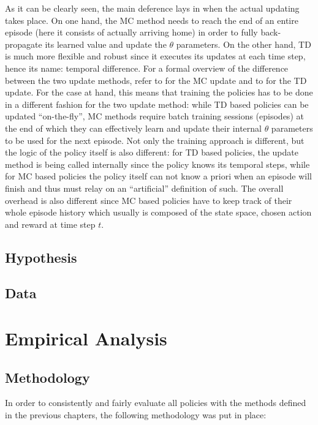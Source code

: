 \documentclass{seal_thesis}
\begin{document}
As it can be clearly seen, the main deference lays in when the actual updating takes place. On one hand, the MC method needs to reach the end of an entire episode (\ie here it consists of actually arriving home) in order to fully back-propagate its learned value and update the $\theta$ parameters. On the other hand, TD is much more flexible and robust since it executes its updates at each time step, hence its name: temporal difference.
For a formal overview of the difference between the two update methods, refer to  for the MC update and to  for the TD update.
For the case at hand, this means that training the policies has to be done in a different fashion for the two update method: while TD based policies can be updated ``on-the-fly'', MC methods require batch training sessions (\ie episodes) at the end of which they can effectively learn and update their internal $\theta$ parameters to be used for the next episode. Not only the training approach is different, but the logic of the policy itself is also different: for TD based policies, the update method is being called internally since the policy knows its temporal steps, while for MC based policies the policy itself can not know a priori when an episode will finish and thus must relay on an ``artificial'' definition of such. The overall overhead is also different since MC based policies have to keep track of their whole episode history which usually is composed of the state space, chosen action and reward at time step $t$.


\section{Hypothesis}
\section{Data}

\chapter{Empirical Analysis}
\label{ch:empirical_analysis}

\section{Methodology}

In order to consistently and fairly evaluate all policies with the methods defined in the previous chapters, the following methodology was put in place:
\end{document}
